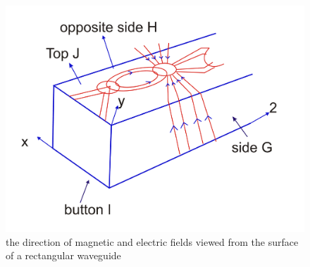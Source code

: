 \begin{figure}[H]
\centering
\includegraphics[width=1\linewidth]{./graphics/lecture2-image-a.png}
\caption{the direction of magnetic and electric fields viewed from the surface of a rectangular waveguide}
\end{figure}

